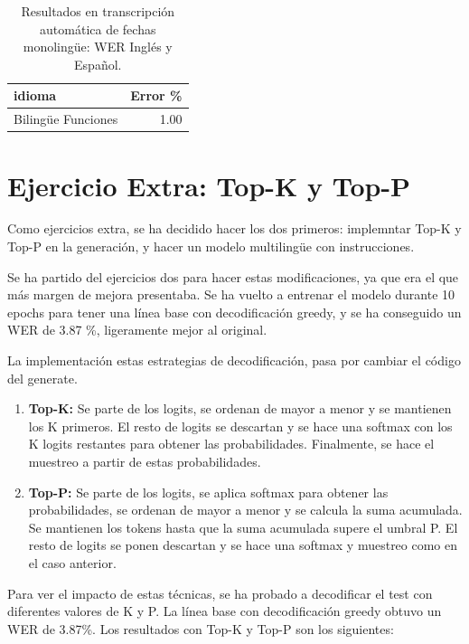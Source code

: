 \documentclass[11pt,spanish,listoffigures,listoftables]{tfgetsinf}
\begin{document}
\begin{table}[H]
\centering
\begin{tabular}{lr}
	\toprule
	\textbf{idioma} & \textbf{Error \%} \\
	\midrule
	Bilingüe Funciones & 1.00 \\
	\bottomrule
\end{tabular}
\caption{Resultados en transcripción automática de fechas monolingüe: WER Inglés y Español.}
\label{tab:wer_ej1}
\end{table}


\section{Ejercicio Extra: Top-K y Top-P}
Como ejercicios extra, se ha decidido hacer los dos primeros: implemntar Top-K y Top-P en la generación, y hacer un modelo multilingüe con instrucciones.

Se ha partido del ejercicios dos para hacer estas modificaciones, ya que era el que más margen de mejora presentaba. Se ha vuelto a entrenar el modelo durante 10 epochs para tener una línea base con decodificación greedy, y se ha conseguido un WER de 3.87 \%, ligeramente mejor al original.

La implementación estas estrategias de decodificación, pasa por cambiar el código del generate. 

\begin{enumerate}
  \item \textbf{Top-K:} Se parte de los logits, se ordenan de mayor a menor y se mantienen los K primeros. El resto de logits se descartan y se hace una softmax con los K logits restantes para obtener las probabilidades. Finalmente, se hace el muestreo a partir de estas probabilidades.
  \item \textbf{Top-P:} Se parte de los logits, se aplica softmax para obtener las probabilidades, se ordenan de mayor a menor y se calcula la suma acumulada. Se mantienen los tokens hasta que la suma acumulada supere el umbral P. El resto de logits se ponen descartan y se hace una softmax y muestreo como en el caso anterior.
\end{enumerate}

Para ver el impacto de estas técnicas, se ha probado a decodificar el test con diferentes valores de K y P. La línea base con decodificación greedy obtuvo un WER de 3.87\%. Los resultados con Top-K y Top-P son los siguientes:
\end{document}
